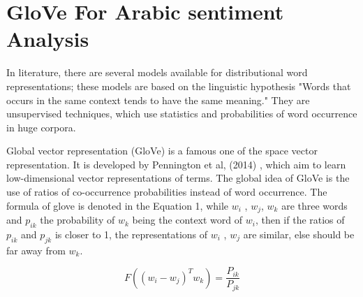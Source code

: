 \documentclass[conference]{IEEEtran}
\begin{document}
	\section{GloVe For Arabic sentiment Analysis}
	In literature, there are several models available for distributional word representations; these models are based on the linguistic hypothesis "Words that occurs in the same context tends to have the same meaning." They are unsupervised techniques, which use statistics and probabilities of word occurrence in huge corpora.
	
	Global vector representation (GloVe) is a famous one of the space vector representation.  It is developed by Pennington et al, (2014) \cite{8318770}, which aim to learn low-dimensional vector representations of terms. The global idea of GloVe is the use of ratios of co-occurrence probabilities instead of word occurrence. The formula of glove is denoted in the Equation 1, while $w_{i}$ ,  $w_{j}$,  $w_{k}$ are three words and  $p_{ik}$ the probability of  $w_{k}$ being the context word of  $w_{i}$, then if the ratios of   $p_{ik}$ and  $p_{jk}$ is closer to 1, the representations of   $w_{i}$ ,  $w_{j}$ are similar, else should be far away from  $w_{k}$.
	
	\begin{equation}
	F((w_{i}-w_{j})^Tw_{k}) =\frac{P_{ik}}{P_{jk}}\label{Pr}
	\end{equation}
	
\end{document}
